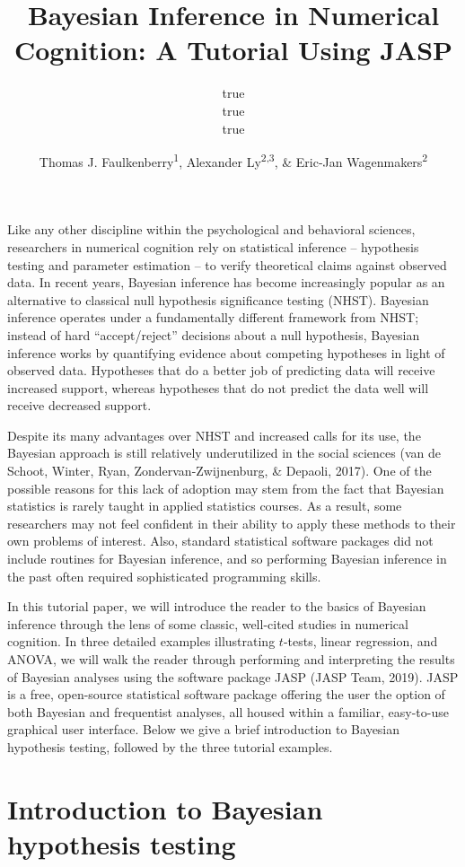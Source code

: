 \documentclass[english,,doc,floatsintext]{apa6}
\title{Bayesian Inference in Numerical Cognition: A Tutorial Using JASP}
\author{true \\ true \\ true}
\date{}
\author{Thomas J. Faulkenberry\textsuperscript{1}, Alexander Ly\textsuperscript{2,3}, \& Eric-Jan Wagenmakers\textsuperscript{2}}
\affiliation{
\vspace{0.5cm}
\textsuperscript{1} Tarleton State University\\\textsuperscript{2} University of Amsterdam\\\textsuperscript{3} Centrum Wiskunde \& Informatica}
\begin{document}
\maketitle

Like any other discipline within the psychological and behavioral sciences, researchers in numerical cognition rely on statistical inference -- hypothesis testing and parameter estimation -- to verify theoretical claims against observed data. In recent years, Bayesian inference has become increasingly popular as an alternative to classical null hypothesis significance testing (NHST). Bayesian inference operates under a fundamentally different framework from NHST; instead of hard \enquote{accept/reject} decisions about a null hypothesis, Bayesian inference works by quantifying evidence about competing hypotheses in light of observed data. Hypotheses that do a better job of predicting data will receive increased support, whereas hypotheses that do not predict the data well will receive decreased support.

Despite its many advantages over NHST and increased calls for its use, the Bayesian approach is still relatively underutilized in the social sciences (van de Schoot, Winter, Ryan, Zondervan-Zwijnenburg, \& Depaoli, 2017). One of the possible reasons for this lack of adoption may stem from the fact that Bayesian statistics is rarely taught in applied statistics courses. As a result, some researchers may not feel confident in their ability to apply these methods to their own problems of interest. Also, standard statistical software packages did not include routines for Bayesian inference, and so performing Bayesian inference in the past often required sophisticated programming skills.

In this tutorial paper, we will introduce the reader to the basics of Bayesian inference through the lens of some classic, well-cited studies in numerical cognition. In three detailed examples illustrating \(t\)-tests, linear regression, and ANOVA, we will walk the reader through performing and interpreting the results of Bayesian analyses using the software package JASP (JASP Team, 2019). JASP is a free, open-source statistical software package offering the user the option of both Bayesian and frequentist analyses, all housed within a familiar, easy-to-use graphical user interface. Below we give a brief introduction to Bayesian hypothesis testing, followed by the three tutorial examples.

\hypertarget{introduction-to-bayesian-hypothesis-testing}{%
\section{Introduction to Bayesian hypothesis testing}\label{introduction-to-bayesian-hypothesis-testing}}
\end{document}
